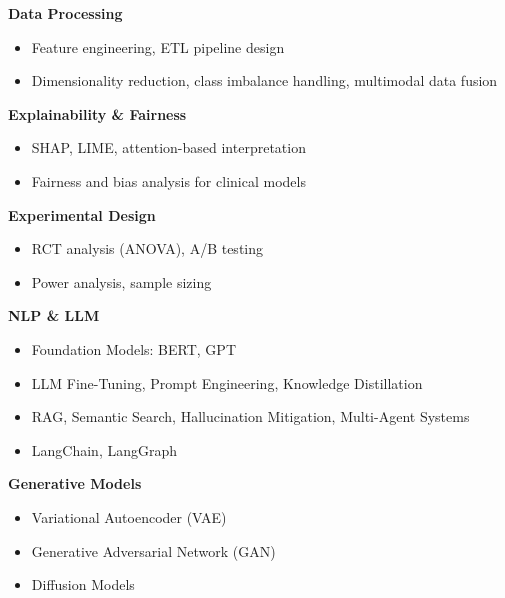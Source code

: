 \documentclass[10pt,a4paper,ragged2e]{altacv}
\newcommand{\skillcategory}[2]{%
  \smallskip
  \noindent\colorbox{VividPurple!15}{%
    \textcolor{VividPurple}{#1}\;\textbf{\small #2}%
  }%
  \smallskip
}
\begin{document}
{\skillcategory{\faCogs}{Data Processing}
\begin{itemize}
    \item Feature engineering, ETL pipeline design
    \item Dimensionality reduction, class imbalance handling, multimodal data fusion
\end{itemize}
\smallskip
\skillcategory{\faSearch}{Explainability \& Fairness}
\begin{itemize}
    \item SHAP, LIME, attention-based interpretation
    \item Fairness and bias analysis for clinical models
\end{itemize}
\smallskip
\skillcategory{\faLineChart}{Experimental Design}
\begin{itemize}
    \item RCT analysis (ANOVA), A/B testing
    \item Power analysis, sample sizing
\end{itemize}
\smallskip
\skillcategory{\faBook}{NLP \& LLM}
\begin{itemize}
  \item Foundation Models: BERT, GPT
  \item LLM Fine-Tuning, Prompt Engineering, Knowledge Distillation
  \item RAG, Semantic Search, Hallucination Mitigation, Multi-Agent Systems
  \item LangChain, LangGraph
\end{itemize}
\smallskip
\skillcategory{\faFlask}{Generative Models}
\begin{itemize}
  \item Variational Autoencoder (VAE)
  \item Generative Adversarial Network (GAN)
  \item Diffusion Models
\end{itemize}
}

\vspace{-2mm}
\end{document}
